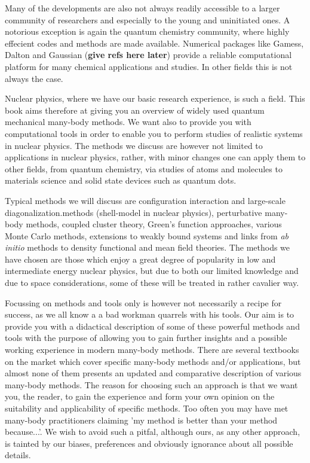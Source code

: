 Many of the developments are also not 
always readily accessible to a larger community of
researchers and especially to the young and uninitiated ones. A notorious exception is 
again the quantum chemistry community, where highly effecient codes and methods are made available.  
Numerical packages like
Gamess, Dalton and Gaussian ({\bf give refs here later}) provide a reliable computational 
platform for many  chemical applications and studies.
In other fields this is not always the case.     

Nuclear physics, where we have our basic research experience, is such a field.
This book aims therefore at giving you an overview 
of widely used quantum mechanical  many-body methods. We want also to provide you with computational tools in order to enable you
to perform studies of realistic systems  in nuclear physics. 
The methods we discuss are however not limited to applications
in nuclear physics, rather, with  minor  changes one can apply them to other fields, from quantum chemistry, via studies of atoms and
molecules to materials science and solid state devices such as quantum dots.  

Typical methods we will discuss are 
configuration interaction and large-scale diagonalization.methods (shell-model in nuclear physics), perturbative many-body methods, 
coupled cluster theory, Green's function approaches, various Monte Carlo methods, extensions to weakly  bound systems and links
from {\em ab initio} methods to  density functional and mean field theories. 
The methods we have chosen are those which enjoy a great degree of popularity in low and intermediate energy nuclear physics, 
but due to both our limited knowledge
and due to space considerations, some of these will be treated in rather cavalier way.

Focussing on methods and tools only is however not necessarily a recipe for success, as we all know a 
a bad workman quarrels with his tools. Our aim is to provide 
you with a didactical description
of some of these  powerful methods and tools with the purpose of allowing you to
gain further insights and a possible working experience in modern many-body methods.
There are several textbooks on the market which cover specific 
many-body methods and/or applications, but almost none of them
presents an updated and comparative description of various many-body methods. The reason for choosing such an approach
is that we want you, the reader, to gain the experience and form your own opinion on the suitability and applicability
of specific methods. Too often you may have met many-body practitioners
claiming 'my method is better than your method because...'.  We wish to avoid such a pitfal, although ours, as any other approach,
is tainted by our biases, preferences and obviously ignorance about all possible details. 

